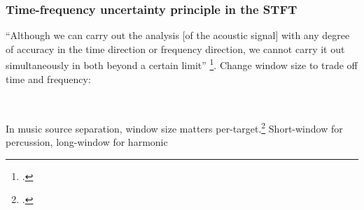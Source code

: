 \documentclass[usenames,dvipsnames]{beamer}
\begin{document}
\begin{frame}
	\frametitle{Time-frequency uncertainty principle in the STFT}
	``Although we can carry out the analysis [of the acoustic signal] with any degree of accuracy in the time direction or frequency direction, we cannot carry it out simultaneously in both beyond a certain limit'' \footcite[432]{gabor1946}. Change window size to trade off time and frequency:
	\begin{figure}[ht]
		\centering
		\vspace{-1.25em}
		\\
		\vspace{-1.5em}
		\vspace{-1em}
	\end{figure}
	In music source separation, window size matters per-target.\footcite{tftradeoff1} Short-window for percussion, long-window for harmonic
\end{frame}
\end{document}
